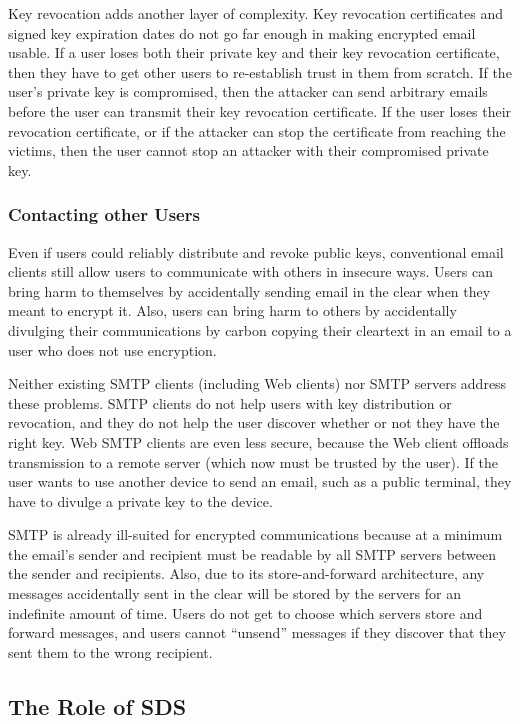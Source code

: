 Key revocation adds another layer of complexity.  Key revocation certificates
and signed key expiration dates do not go far enough in making encrypted email
usable.  If a user loses both their private key and their key revocation
certificate, then they have to get other users to re-establish trust in them
from scratch.  If the user's private key is compromised, then the attacker can
send arbitrary emails before the user can transmit their key revocation
certificate.  If the user loses their revocation certificate, or if the attacker
can stop the certificate from reaching the victims, then the user cannot stop an
attacker with their compromised private key.

\subsubsection{Contacting other Users}

Even if users could reliably distribute and revoke public keys, conventional
email clients still allow users to communicate with others in insecure ways.
Users can bring harm to themselves by accidentally sending email in the clear
when they meant to encrypt it.  Also, users can bring harm to others
by accidentally divulging their communications by carbon copying
their cleartext in an email to a user who does not use encryption.

Neither existing SMTP clients (including Web clients) nor
SMTP servers address these problems.  SMTP clients do not help users with key
distribution or revocation, and they do not help the user discover whether or
not they have the right key.  Web SMTP clients are even less secure, because the
Web client offloads transmission to a remote server (which now must be trusted
by the user).  If the user wants to use another device to send an email, such as
a public terminal, they have to divulge a private key to the device.

SMTP is already ill-suited for encrypted communications because at a minimum the email's
sender and recipient must be readable by all SMTP servers between the sender and
recipients.  Also, due to its store-and-forward architecture, any messages
accidentally sent in the clear will be stored by the servers for an
indefinite amount of time.  Users do not get to choose which servers store and forward
messages, and users cannot ``unsend'' messages if they discover that they sent
them to the wrong recipient.

\subsection{The Role of SDS}

